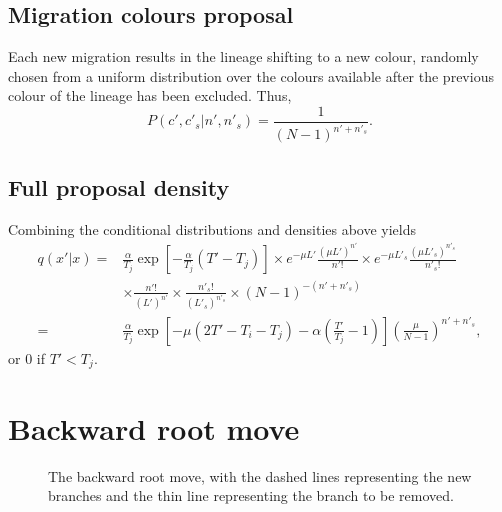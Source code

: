 \documentclass[a4paper,11pt]{article}
\begin{document}
\subsection{Migration colours proposal}

Each new migration results in the lineage shifting to a new colour,
randomly chosen from a uniform distribution over the colours available
after the previous colour of the lineage has been excluded.  Thus,
\begin{equation}
  P(c',c'_s|n',n'_s)=\frac{1}{(N-1)^{n'+n'_s}}.
\end{equation}

\subsection{Full proposal density}

Combining the conditional distributions and densities above yields
\begin{align}
  q(x'|x)=&\frac{\alpha}{T_j}\exp\left[-\frac{\alpha}{T_j}(T'-T_j)\right]
  \times e^{-\mu L'}\frac{(\mu L')^{n'}}{n'!}
  \times e^{-\mu L'_s}\frac{(\mu L'_s)^{n'_s}}{n'_s!}\nonumber\\
  &\times \frac{n'!}{(L')^{n'}}
  \times \frac{n'_s!}{(L'_s)^{n'_s}}
  \times (N-1)^{-(n'+n'_s)}\nonumber\\
=&\frac{\alpha}{T_j}\exp\left[-\mu(2T'-T_i-T_j)-\alpha\left(\frac{T'}{T_j}-1\right)\right]\left(\frac{\mu}{N-1}\right)^{n'+n'_s},
\end{align}
or $0$ if $T'<T_j$.

\section{Backward root move}

\begin{figure}
\begin{center}
\end{center}
\caption{The backward root move, with the dashed lines representing
the new branches and the thin line representing the branch to be
removed.}
\end{figure}
\end{document}
